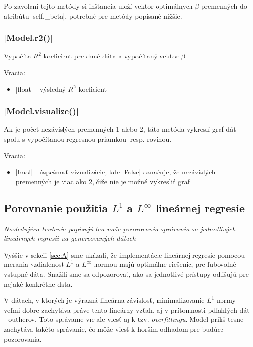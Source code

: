 \documentclass[report.tex]{subfiles}
\begin{document}
Po zavolaní tejto metódy si inštancia uloží vektor optimálnych $\beta$ premenných do atribútu \pyth|self._beta|, potrebné pre metódy popísané nižšie.

\subsubsection*{\pyth|Model.r2()|}

Vypočíta $R^2$ koeficient pre dané dáta a vypočítaný vektor $\beta$.

Vracia:

\begin{itemize}
	\item \pyth|float| - výsledný $R^2$ koeficient
\end{itemize}

\subsubsection*{\pyth|Model.visualize()|}

Ak je počet nezávislých premenných 1 alebo 2, táto metóda vykreslí graf dát spolu s vypočítanou regresnou priamkou, resp. rovinou. 

Vracia:

\begin{itemize}
	\item \pyth|bool| - úspešnosť vizualizácie, kde \pyth|False| označuje, že nezávislých premenných je viac ako 2, čiže nie je možné vykresliť graf
\end{itemize}

\subsection{Porovnanie použitia $L^1$ a $L^{\infty}$ lineárnej regresie}

\textit{Nasledujúca tvrdenia popisujú len naše pozorovania správania sa jednotlivých lineárnych regresii na genereovaných dátach}

Vyššie v sekcii \ref{sec:A} sme ukázali, že implementácie lineárnej regresie pomocou merania vzdialenost $L^1$ a $L^{\infty}$ normou majú optimálne riešenie, pre ľubovoľné vstupné dáta. Snažili sme sa odpozorovať, ako sa jednotlivé prístupy odlišujú pre nejaké konkrétne dáta.

V dátach, v ktorých je výrazná lineárna závislosť, minimalizovanie $L^1$ normy veľmi dobre zachytáva práve tento lineárny vzťah, aj v prítomnosti pdľahlých dát - outlierov. Toto správanie vie ale viesť aj k tzv. \textit{overfittingu}. Model príliš tesne zachytáva takéto správanie, čo môže viesť k horším odhadom pre budúce pozorovania.
\end{document}

